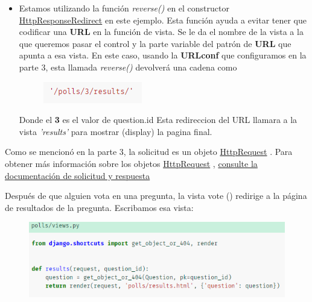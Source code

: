 \documentclass[10pt]{article}
\begin{document}
\begin{itemize}
\item
Estamos utilizando la función \textit{reverse()} en el constructor {\href{https://docs.djangoproject.com/en/3.0/ref/request-response/\#django.http.HttpResponseRedirect}{\textcolor{B}{HttpResponseRedirect}}} en este ejemplo. Esta función ayuda a evitar tener que codificar una \textbf{URL} en la función de vista. Se le da el nombre de la vista a la que queremos pasar el control y la parte variable del patrón de \textbf{URL} que apunta a esa vista. En este caso, usando la \textbf{URLconf} que configuramos en la parte 3, esta llamada \textit{reverse()} devolverá una cadena como

\begin{figure}[H]
\begin{center}
\includegraphics[scale=1]{figuras/3/34/341/img4.png}
\end{center}
\end{figure}
Donde el \textbf{3} es el valor de \textcolor{G}{question.id}
Esta redireccion del URL llamara a la vista \textit{'results'}
para mostrar (display) la pagina final. 

\end{itemize}

Como se mencionó en la parte 3, la solicitud es un objeto {\href{https://docs.djangoproject.com/en/3.0/ref/request-response/\#django.http.HttpRequest}{\textcolor{B}{HttpRequest}}}
. Para obtener más información sobre los objetos {\href{https://docs.djangoproject.com/en/3.0/ref/request-response/\#django.http.HttpRequest}{\textcolor{B}{HttpRequest}}}
, {\href{https://docs.djangoproject.com/en/3.0/ref/request-response/}{\textcolor{B}{consulte la documentación de solicitud y respuesta}}}


Después de que alguien vota en una pregunta, la vista vote () redirige a la página de resultados de la pregunta. Escribamos esa vista:


\begin{figure}[H]
\begin{center}
\includegraphics[scale=1]{figuras/3/34/341/img5.png}
\end{center}
\end{figure}
\end{document}
